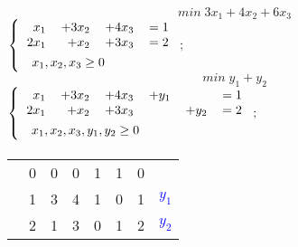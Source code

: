\documentclass{article}
\begin{document}
        \begin{preview}
                \paragraph{}
                \begin{equation*}
                        min \; 3 x_1 + 4 x_2 + 6 x_3
                \end{equation*}
                \begin{math}
                        \begin{dcases}
                                \begin{tabular}{r r r l}
                                        $ x_1 $ & $ + 3 x_2 $ & $ + 4 x_3 $ & $ = 1 $ \\
                                        $ 2 x_1 $ & $ + x_2 $ & $ + 3 x_3 $ & $ = 2 $
                                \end{tabular} \\
                                \quad
                                x_1, x_2, x_3 \geq{0}
                        \end{dcases};
                \end{math}
                \begin{equation*}
                        min \; y_1 + y_2
                \end{equation*}
                \begin{math}
                        \begin{dcases}
                                \begin{tabular}{r r r r r l}
                                        $ x_1 $ & $ + 3 x_2 $ & $ + 4 x_3 $ & $ + y_1 $ &  & $ = 1 $ \\
                                        $ 2 x_1 $ & $ + x_2 $ & $ + 3 x_3 $ & & $ + y_2 $ & $ = 2 $
                                \end{tabular} \\
                                \quad
                                x_1, x_2, x_3, y_1, y_2 \geq{0}
                        \end{dcases};
                \end{math}

                \paragraph{}
                \begin{tabular}{r | r r r r r | r | r}
                        \cline{2-7}
                        & 0 & 0 & 0 & 1 & 1 & 0 & \\
                        \cline{2-7}
                        & 1 & 3 & 4 & 1 & 0 & 1 & \textcolor{blue}{ $ y_1 $ } \\
                        & 2 & 1 & 3 & 0 & 1 & 2 & \textcolor{blue}{$ y_2 $ } \\
                        \cline{2-7}
                \end{tabular}


\end{preview}
\end{document}

